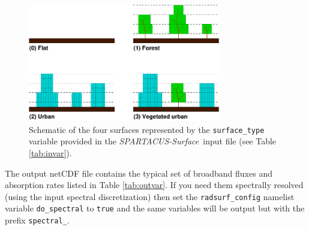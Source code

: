 \documentclass[a4,oneside]{article}
\def\codesize{\small}
\def\spsurf{\emph{SPARTACUS-Surface}}
\def\code#1{{\codesize\texttt{#1}}}
\begin{document}
\begin{figure}[tb!]
  \centerline{\includegraphics[width=0.75\textwidth]{surface_type_schematic.pdf}}
  \caption{\label{fig:type_schematic}Schematic of the four surfaces
    represented by the \code{surface\_type} variable provided in the
    \spsurf\ input file (see Table \ref{tab:invar}).}
\end{figure}

The output netCDF file contains the typical set of broadband fluxes
and absorption rates listed in Table \ref{tab:outvar}. If you need
them spectrally resolved (using the input spectral discretization)
then set the \code{radsurf\_config} namelist variable
\code{do\_spectral} to \code{true} and the same variables will be
output but with the prefix \code{spectral\_}.
\end{document}
